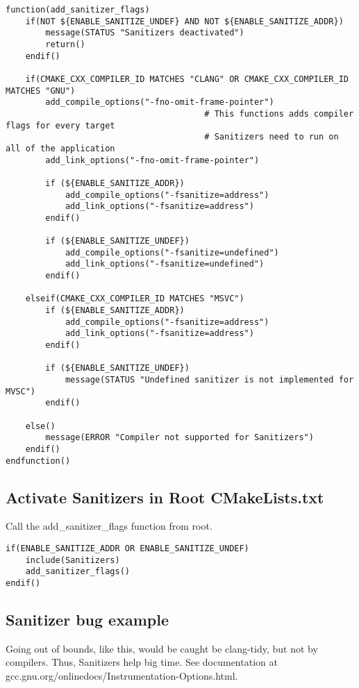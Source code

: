 \begin{verbatim}
function(add_sanitizer_flags)
    if(NOT ${ENABLE_SANITIZE_UNDEF} AND NOT ${ENABLE_SANITIZE_ADDR})
        message(STATUS "Sanitizers deactivated") 
        return()
    endif()

    if(CMAKE_CXX_COMPILER_ID MATCHES "CLANG" OR CMAKE_CXX_COMPILER_ID MATCHES "GNU")
        add_compile_options("-fno-omit-frame-pointer")   
                                        # This functions adds compiler flags for every target
                                        # Sanitizers need to run on all of the application
        add_link_options("-fno-omit-frame-pointer")

        if (${ENABLE_SANITIZE_ADDR})
            add_compile_options("-fsanitize=address") 
            add_link_options("-fsanitize=address") 
        endif()

        if (${ENABLE_SANITIZE_UNDEF})
            add_compile_options("-fsanitize=undefined") 
            add_link_options("-fsanitize=undefined") 
        endif()

    elseif(CMAKE_CXX_COMPILER_ID MATCHES "MSVC")
        if (${ENABLE_SANITIZE_ADDR})
            add_compile_options("-fsanitize=address") 
            add_link_options("-fsanitize=address") 
        endif()

        if (${ENABLE_SANITIZE_UNDEF})
            message(STATUS "Undefined sanitizer is not implemented for MVSC")
        endif()

    else() 
        message(ERROR "Compiler not supported for Sanitizers")
    endif()
endfunction()
\end{verbatim}


\subsection{Activate Sanitizers in Root CMakeLists.txt}

Call the add\_sanitizer\_flags function from root.

\begin{verbatim}
if(ENABLE_SANITIZE_ADDR OR ENABLE_SANITIZE_UNDEF)
    include(Sanitizers)
    add_sanitizer_flags()
endif()
\end{verbatim}

\subsection{Sanitizer bug example}

Going out of bounds, like this, would be caught be clang-tidy, but not by compilers. Thus, Sanitizers help big time. See documentation at
gcc.gnu.org/onlinedocs/Instrumentation-Options.html.


